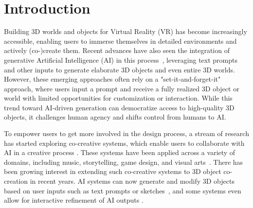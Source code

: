 
\section{Introduction}
Building 3D worlds and objects for Virtual Reality (VR) has become increasingly accessible, enabling users to immerse themselves in detailed environments and actively (co-)create them. Recent advances have also seen the integration of generative Artificial Intelligence (AI) in this process~\cite{10.1145/3613904.3642579}, leveraging text prompts and other inputs to generate elaborate 3D objects and even entire 3D worlds.
However, these emerging approaches often rely on a "set-it-and-forget-it" approach, where users input a prompt and receive a fully realized 3D object or world with limited opportunities for customization or interaction. 
While this trend toward AI-driven generation can democratize access to high-quality 3D objects, it challenges human agency and shifts control from humans to AI.

To empower users to get more involved in the design process, a stream of research has started exploring co-creative systems, which enable users to collaborate with AI in a creative process \cite{davis_human-computer_2013}. These systems have been applied across a variety of domains, including music, storytelling, game design, and visual arts~\cite{liapis_sentient_2013,lucas_stay_2017,davis_empirically_2016,oh_i_2018,lin_it_2020}. 
There has been growing interest in extending such co-creative systems to 3D object co-creation in recent years. AI systems can now generate and modify 3D objects based on user inputs such as text prompts or sketches~\cite{poole_dreamfusion_2022, lin_magic3d_2023, michel_text2mesh_2021, jun_shap-e_2023, mikaeili_sked_2023, lun_3d_2017}, and some systems even allow for interactive refinement of AI outputs \cite{liu_interactive_2018, urban_davis_designing_2021}.


